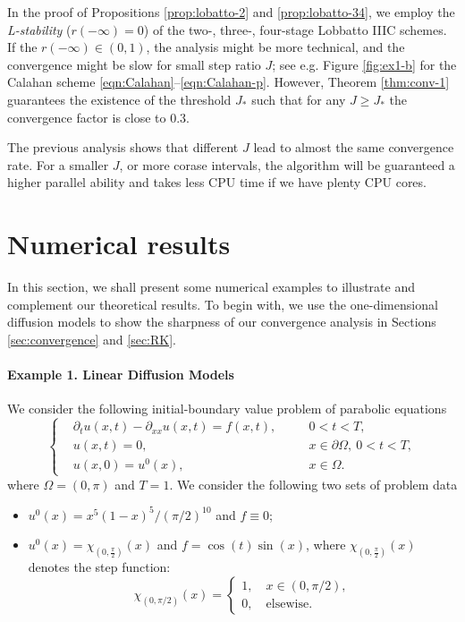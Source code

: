 \begin{remark}\label{rem:calahan}
In the proof of Propositions \ref{prop:lobatto-2} and \ref{prop:lobatto-34}, we employ the \textsl{L-stability} ($r(-\infty) = 0$) of the two-, three-, four-stage Lobbatto IIIC schemes. If the $r(-\infty) \in (0,1)$,
the analysis might be more technical, and the convergence might be
slow for small step ratio $J$; see e.g. Figure \ref{fig:ex1-b} for the Calahan scheme \eqref{eqn:Calahan}--\eqref{eqn:Calahan-p}.
However, Theorem \ref{thm:conv-1} guarantees the existence of the
threshold $J_*$ such that for any $J\ge J_*$ the convergence factor is close to $0.3$.
\end{remark}

{
\begin{remark}
The previous analysis shows that different $J$ lead to almost the same convergence rate. For a smaller $J$, or more corase intervals, the algorithm will be guaranteed a higher parallel ability and takes less CPU time if we have plenty CPU cores. 
\end{remark}}

\section{Numerical results}
In this section, we shall present some numerical examples to illustrate and complement our theoretical results.
To begin with, we use the one-dimensional diffusion models to show the sharpness of our convergence analysis in Sections \ref{sec:convergence} and \ref{sec:RK}.

\paragraph{Example 1. Linear Diffusion Models}
We consider the following initial-boundary value problem of parabolic equations
\begin{equation}\label{eqn:diffusion}
    \left \{
\begin{aligned}
&\partial_t u (x,t) - \partial_{xx} u(x,t) = f(x,t), &&\quad 0<t<T,\\
& u(x,t)=0,&&\quad x\in\partial\Omega,~0<t<T, \\
& u(x,0)=u^0(x),&&\quad x\in\Omega.
\end{aligned}
\right.
\end{equation}
where $\Omega=(0,\pi)$ and $T=1$. We consider the following two sets of problem data
\begin{itemize}
    \item[(a)] $u^0(x) = x^{5}(1-x)^{5}/(\pi/2)^{10}$
    and $f\equiv0$;
    \item[(b)] $u^0(x) = \chi_{(0,\frac\pi2)}(x)$ and $f=\cos(t) \sin(x)$, where $\chi_{(0,\frac\pi2)}(x)$ denotes the step function:
    \begin{equation*}
 \chi_{(0,\pi/2)}(x)  =
 \begin{cases}
 1, \quad x\in(0,\pi/2),\\
0, \quad \text{elsewise}.
 \end{cases}
\end{equation*}
\end{itemize}

